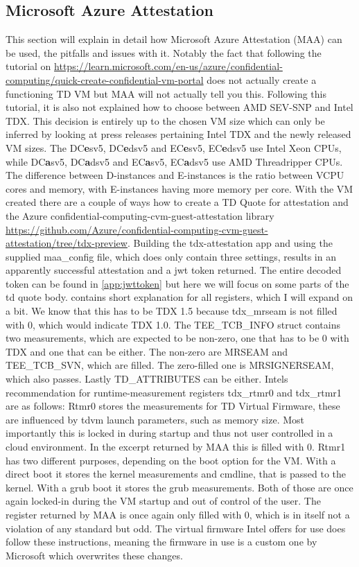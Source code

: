 \subsection{Microsoft Azure Attestation}
This section will explain in detail how Microsoft Azure Attestation (MAA) can be used, the pitfalls and issues with it. Notably the fact that following the tutorial on \url{https://learn.microsoft.com/en-us/azure/confidential-computing/quick-create-confidential-vm-portal} does not actually create a functioning TD VM but MAA will not actually tell you this. Following this tutorial, it is also not explained how to choose between AMD SEV-SNP and Intel TDX. This decision is entirely up to the chosen VM size which can only be inferred by looking at press releases pertaining Intel TDX and the newly released VM sizes. The DC\textbf{e}sv5, DC\textbf{e}dsv5 and EC\textbf{e}sv5, EC\textbf{e}dsv5 use Intel Xeon CPUs, while DC\textbf{a}sv5, DC\textbf{a}dsv5 and EC\textbf{a}sv5, EC\textbf{a}dsv5 use AMD Threadripper CPUs. The difference between D-instances and E-instances is the ratio between VCPU cores and memory, with E-instances having more memory per core. With the VM created there are a couple of ways how to create a TD Quote for attestation and the Azure confidential-computing-cvm-guest-attestation library \url{https://github.com/Azure/confidential-computing-cvm-guest-attestation/tree/tdx-preview}. Building the tdx-attestation app and using the supplied maa\_config file, which does only contain three settings, results in an apparently successful attestation and a jwt token returned. The entire decoded token can be found in \ref{app:jwttoken} but here we will focus on some parts of the td quote body. \cite{dcap-library} contains short explanation for all registers, which I will expand on a bit. We know that this has to be TDX 1.5 because tdx\_mrseam is not filled with 0, which would indicate TDX 1.0. The TEE\_TCB\_INFO struct contains two measurements, which are expected to be non-zero, one that has to be 0 with TDX and one that can be either. The non-zero are MRSEAM and TEE\_TCB\_SVN, which are filled. The zero-filled one is MRSIGNERSEAM, which also passes. Lastly TD\_ATTRIBUTES can be either. Intels recommendation for runtime-measurement registers tdx\_rtmr0 and tdx\_rtmr1 are as follows: Rtmr0 stores the measurements for TD Virtual Firmware, these are influenced by tdvm launch parameters, such as memory size. Most importantly this is locked in during startup and thus not user controlled in a cloud environment. In the excerpt returned by MAA this is filled with 0. Rtmr1 has two different purposes, depending on the boot option for the VM. With a direct boot it stores the kernel measurements and cmdline, that is passed to the kernel. With a grub boot it stores the grub measurements. Both of those are once again locked-in during the VM startup and out of control of the user. The register returned by MAA is once again only filled with 0, which is in itself not a violation of any standard but odd. The virtual firmware Intel offers for use does follow these instructions, meaning the firmware in use is a custom one by Microsoft which overwrites these changes.

